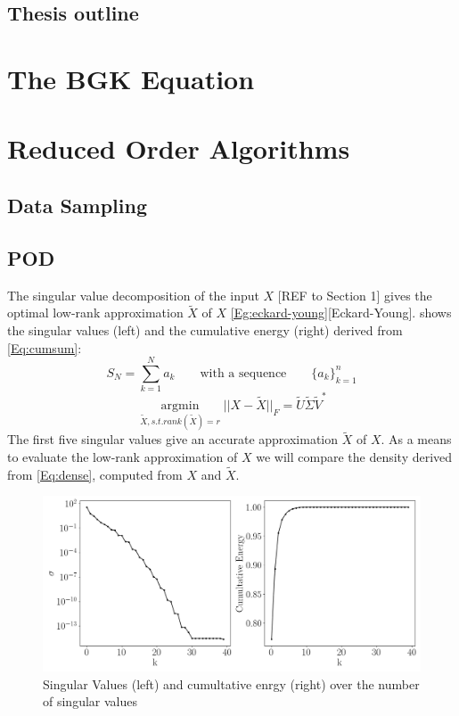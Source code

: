 \documentclass[12pt, a4paper]{article}
\begin{document}
\subsection{Thesis outline}
\section{The BGK Equation}
\section{Reduced Order Algorithms}
\subsection{Data Sampling}
\subsection{POD}
The singular value decomposition of the input $X$ [REF to Section 1] gives the optimal low-rank approximation $\tilde{X}$ of $X$ \cref{Eg:eckard-young}[Eckard-Young].  shows the singular values (left) and the cumulative energy (right) derived from \cref{Eq:cumsum}:
\begin{equation}
S_N = \sum_{k=1}^{N}a_k \qquad\textrm{with a sequence} \qquad\{a_k\}_{k=1}^{n} 
\label{Eq:cumsum}
\end{equation}
\begin{equation}
\underset{\tilde{X}, s.t. rank(\tilde{X})=r}{\operatorname{argmin}} || X -\tilde{X} ||_F=\tilde{U}\tilde{\Sigma}\tilde{V}^*
\label{Eg:eckard-young}
\end{equation}
The first five singular values give an accurate approximation $\tilde{X}$ of $X$.  
As a means to evaluate the low-rank approximation of $X$ we will compare the density derived from \cref{Eq:dense}, computed from $X$ and $\tilde{X}$.
\begin{figure}[htb!]
	\centering
	\includegraphics[width=\textwidth]{Figures/Cumultative_Singular_Values_kn001.png}
	\caption{Singular Values (left) and cumultative enrgy (right) over the number of singular values}
	\label{Fig:cumu_sing}
\end{figure}
\end{document}
